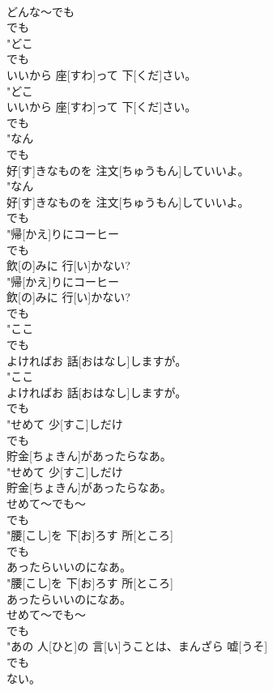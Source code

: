 \documentclass[8pt]{extreport}
\begin{document}
\begin{CJK}{UTF8}{min}
\\	どんな～でも	
\\	でも
\\	"どこ
\\	でも
\\	いいから 座[すわ]って 下[くだ]さい。
\\	"どこ
\\	いいから 座[すわ]って 下[くだ]さい。
\\	でも
\\	"なん
\\	でも
\\	好[す]きなものを 注文[ちゅうもん]していいよ。
\\	"なん
\\	好[す]きなものを 注文[ちゅうもん]していいよ。
\\	でも
\\	"帰[かえ]りにコーヒー
\\	でも
\\	飲[の]みに 行[い]かない?
\\	"帰[かえ]りにコーヒー
\\	飲[の]みに 行[い]かない?
\\	でも
\\	"ここ
\\	でも
\\	よければお 話[おはなし]しますが。
\\	"ここ
\\	よければお 話[おはなし]しますが。
\\	でも
\\	"せめて 少[すこ]しだけ
\\	でも
\\	貯金[ちょきん]があったらなあ。
\\	"せめて 少[すこ]しだけ
\\	貯金[ちょきん]があったらなあ。
\\	せめて～でも～ 
\\	でも
\\	"腰[こし]を 下[お]ろす 所[ところ]
\\	でも
\\	あったらいいのになあ。
\\	"腰[こし]を 下[お]ろす 所[ところ]
\\	あったらいいのになあ。
\\	せめて～でも～ 
\\	でも
\\	"あの 人[ひと]の 言[い]うことは、まんざら 嘘[うそ]
\\	でも
\\	ない。

\end{CJK}
\end{document}
